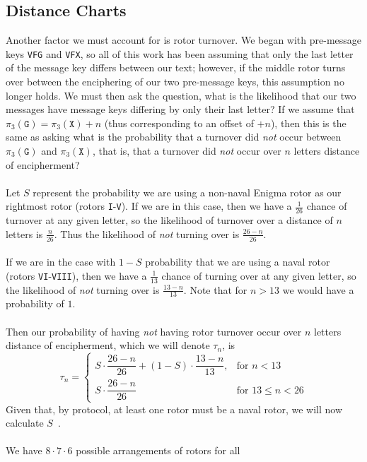 \subsection{Distance Charts}\label{distance_chart}
Another factor we must account for is rotor turnover. We began with
pre-message keys \texttt{VFG} and \texttt{VFX}, so all of this work
has been assuming that only the last letter of the message key
differs between our text; however, if the middle rotor turns over
between the enciphering of our two pre-message keys, this
assumption no longer holds. We must then ask the question, what is
the likelihood that our two messages have message keys differing by
only their last letter? If we assume that $\pi_3(\texttt{G}) =
\pi_3(\texttt{X}) + n$ (thus corresponding to an offset of
$+n$), then this is the same as asking what is the probability that
a turnover did \emph{not} occur between $\pi_3(\texttt{G})$ and
$\pi_3(\texttt{X})$, that is, that a turnover did \emph{not}
occur over $n$ letters distance of encipherment?
\\\\Let $S$ represent the probability we are using a non-naval
Enigma rotor as our rightmost rotor (rotors \texttt{I}-\texttt{V}).
If we are in this case, then we have a $\frac{1}{26}$ chance of
turnover at any given letter, so the likelihood of turnover over a
distance of $n$ letters is $\frac{n}{26}$. Thus the likelihood
of \emph{not} turning over is $\frac{26-n}{26}$.
\\\\If we are in the case with $1-S$ probability that we are using
a naval rotor (rotors \texttt{VI}-\texttt{VIII}), then we have a
$\frac{1}{13}$ chance of turning over at any given letter, so the
likelihood of \emph{not} turning over is $\frac{13-n}{13}$. Note
that for $n>13$ we would have a probability of $1$.
\\\\Then our probability of having \emph{not} having rotor turnover
occur over $n$ letters distance of encipherment, which we will
denote $\tau_n$, is
\[
  \tau_n =
  \begin{cases}
    S \cdot \dfrac{26 - n}{26} + (1 - S) \cdot \dfrac{13 - n}{13},
    & \text{for } n < 13        \\
    S \cdot \dfrac{26 - n}{26}
    & \text{for } 13 \le n < 26
  \end{cases}
\]
Given that, by protocol, at least one rotor must be a naval rotor,
we will now calculate $S$~\cite[Section 5.1]{Hosgood2007}.
\\\\We have $8\cdot7\cdot6$ possible arrangements of rotors for all
